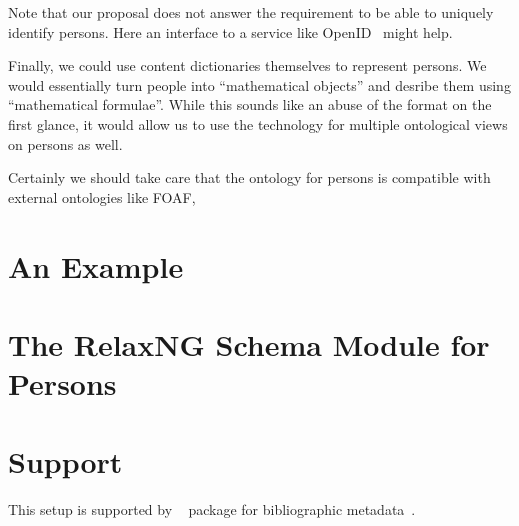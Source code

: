 \documentclass[12pt]{article}
\begin{document}
Note that our proposal does not answer the requirement to be able to uniquely identify
persons. Here an interface to a service like OpenID~\cite{OpenID:webpage} might
help. 

Finally, we could use {\omdoc} content dictionaries themselves to represent persons. We
would essentially turn people into ``mathematical objects'' and desribe them using
``mathematical formulae''. While this sounds like an abuse of the format on the first
glance, it would allow us to use the {\omdoc} technology for multiple ontological views on
persons as well.

Certainly we should take care that the {\omdoc} ontology for persons is compatible with
external ontologies like FOAF,

\section{An Example}\label{sec:example}


\section{The RelaxNG Schema Module for Persons}\label{sec:rnc}


\section{Support}
This setup is supported by {\stex}~\cite{Kohlhase:ulsmf08,sTex:webpage} package for
bibliographic metadata~\cite{Kohlhase:dcm08}.  



\end{document}
